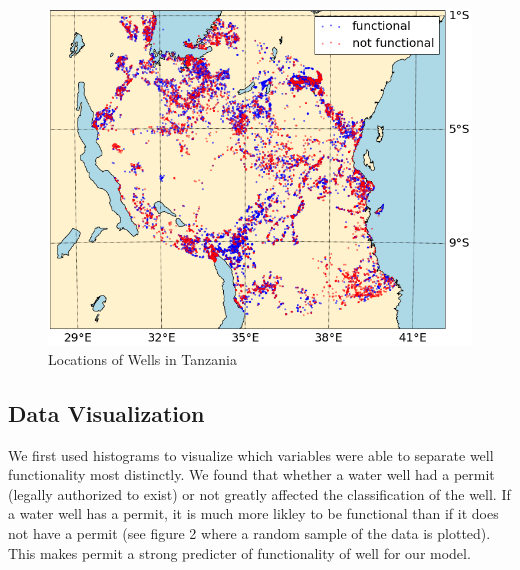 \documentclass[10pt]{SelfArx} %
\begin{document}
\setlength{\abovecaptionskip}{15pt plus 3pt minus 2pt}


\setlength{\belowcaptionskip}{-13pt}
\begin{figure}[ht]\centering
\includegraphics[width=\linewidth]{location.png}
\caption{Locations of Wells in Tanzania}
\label{fig:map}
\end{figure}


\subsection{Data Visualization}

We first used histograms to visualize which variables were able to separate well functionality most distinctly. We found that whether a water well had a permit (legally authorized to exist) or not greatly affected the classification of the well. If a water well has a permit, it is much more likley to be functional than if it does not have a permit (see figure 2 where a random sample of the data is plotted). This makes permit a strong predicter of functionality of well for our model.
\\[-1.5\baselineskip]
\break
\end{document}
